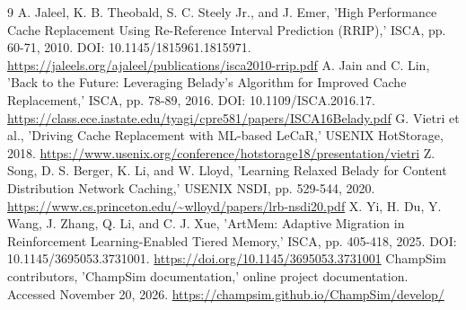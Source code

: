 \documentclass[10pt,a4paper]{article}
\begin{document}
\begin{thebibliography}{9}
 A. Jaleel, K. B. Theobald, S. C. Steely Jr., and J. Emer, 'High Performance Cache Replacement Using Re-Reference Interval Prediction (RRIP),' ISCA, pp. 60-71, 2010. DOI: 10.1145/1815961.1815971. \url{https://jaleels.org/ajaleel/publications/isca2010-rrip.pdf}
 A. Jain and C. Lin, 'Back to the Future: Leveraging Belady's Algorithm for Improved Cache Replacement,' ISCA, pp. 78-89, 2016. DOI: 10.1109/ISCA.2016.17. \url{https://class.ece.iastate.edu/tyagi/cpre581/papers/ISCA16Belady.pdf}
 G. Vietri et al., 'Driving Cache Replacement with ML-based LeCaR,' USENIX HotStorage, 2018. \url{https://www.usenix.org/conference/hotstorage18/presentation/vietri}
 Z. Song, D. S. Berger, K. Li, and W. Lloyd, 'Learning Relaxed Belady for Content Distribution Network Caching,' USENIX NSDI, pp. 529-544, 2020. \url{https://www.cs.princeton.edu/~wlloyd/papers/lrb-nsdi20.pdf}
 X. Yi, H. Du, Y. Wang, J. Zhang, Q. Li, and C. J. Xue, 'ArtMem: Adaptive Migration in Reinforcement Learning-Enabled Tiered Memory,' ISCA, pp. 405-418, 2025. DOI: 10.1145/3695053.3731001. \url{https://doi.org/10.1145/3695053.3731001}
 ChampSim contributors, 'ChampSim documentation,' online project documentation. Accessed November 20, 2026. \url{https://champsim.github.io/ChampSim/develop/}
\end{thebibliography}
\end{document}
